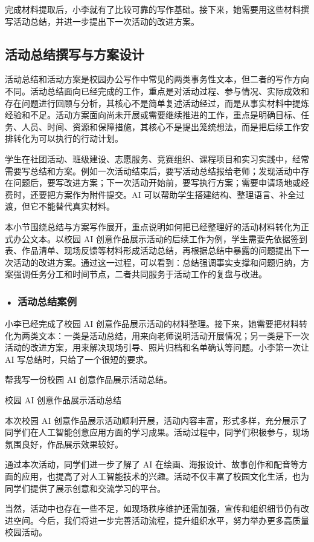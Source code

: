 完成材料提取后，小李就有了比较可靠的写作基础。接下来，她需要用这些材料撰写活动总结，并进一步提出下一次活动的改进方案。


\subsection{活动总结撰写与方案设计}

活动总结和活动方案是校园办公写作中常见的两类事务性文本，但二者的写作方向不同。活动总结面向已经完成的工作，重点是对活动过程、参与情况、实际成效和存在问题进行回顾与分析，其核心不是简单复述活动经过，而是从事实材料中提炼经验和不足。活动方案面向尚未开展或需要继续推进的工作，重点是明确目标、任务、人员、时间、资源和保障措施，其核心不是提出笼统想法，而是把后续工作安排转化为可以执行的行动计划。

学生在社团活动、班级建设、志愿服务、竞赛组织、课程项目和实习实践中，经常需要写总结和方案。例如一次活动结束后，要写活动总结报给老师；发现活动中存在问题后，要写改进方案；下一次活动开始前，要写执行方案；需要申请场地或经费时，还要把方案作为附件提交。AI 可以帮助学生搭建结构、整理语言、补全过渡，但它不能替代真实材料。

本小节围绕总结与方案写作展开，重点说明如何把已经整理好的活动材料转化为正式办公文本。以校园 AI 创意作品展示活动的后续工作为例，学生需要先依据签到表、作品清单、现场反馈等材料形成活动总结，再根据总结中暴露的问题提出下一次活动的改进方案。通过这一过程，可以看到：总结强调事实支撑和问题归纳，方案强调任务分工和时间节点，二者共同服务于活动工作的复盘与改进。

\subsubsection*{\textbf{• 活动总结案例}}

小李已经完成了校园 AI 创意作品展示活动的材料整理。接下来，她需要把材料转化为两类文本：一类是活动总结，用来向老师说明活动开展情况；另一类是下一次活动的改进方案，用来解决现场引导、照片归档和名单确认等问题。小李第一次让 AI 写总结时，只给了一个很短的要求。

\begin{userbox}
帮我写一份校园 AI 创意作品展示活动总结。
\end{userbox}

\begin{aibox}
校园 AI 创意作品展示活动总结

本次校园 AI 创意作品展示活动顺利开展，活动内容丰富，形式多样，充分展示了同学们在人工智能创意应用方面的学习成果。活动过程中，同学们积极参与，现场氛围良好，作品展示效果较好。

通过本次活动，同学们进一步了解了 AI 在绘画、海报设计、故事创作和配音等方面的应用，也提高了对人工智能技术的兴趣。活动不仅丰富了校园文化生活，也为同学们提供了展示创意和交流学习的平台。

当然，活动中也存在一些不足，如现场秩序维护还需加强，宣传和组织细节仍有改进空间。今后，我们将进一步完善活动流程，提升组织水平，努力举办更多高质量校园活动。
\end{aibox}

